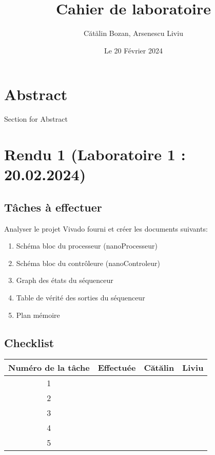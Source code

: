 \documentclass{article}
\title{Cahier de laboratoire}
\date{Le 20 Février 2024}
\author{Cătălin Bozan, Arsenescu Liviu}
\begin{document}
    \maketitle
    \newpage

    \section*{Abstract}
    Section for Abstract
    \newpage

    \tableofcontents
    \newpage

    \section{Rendu 1 (Laboratoire 1 : 20.02.2024)}
    \subsection{Tâches à effectuer}
    Analyser le projet Vivado fourni et créer les documents suivants:
    \begin{enumerate}
        \item Schéma bloc du processeur (nanoProcesseur)
        \item Schéma bloc du contrôleure (nanoControleur)
        \item Graph des états du séquenceur
        \item Table de vérité des sorties du séquenceur
        \item Plan mémoire
    \end{enumerate}
    \subsection{Checklist}
    \begin{center}
        \begin{tabular}{|c|c|c|c|}
            \hline
            Numéro de la tâche & Effectuée & Cătălin & Liviu \\
            \hline
            \hline 1 &   &   &   \\ 
            \hline 2 &   &   &   \\
            \hline 3 &   &   &   \\
            \hline 4 &   &   &   \\
            \hline 5 &   &   &   \\
            \hline
        \end{tabular}
    \end{center}
    \newpage
\end{document}
